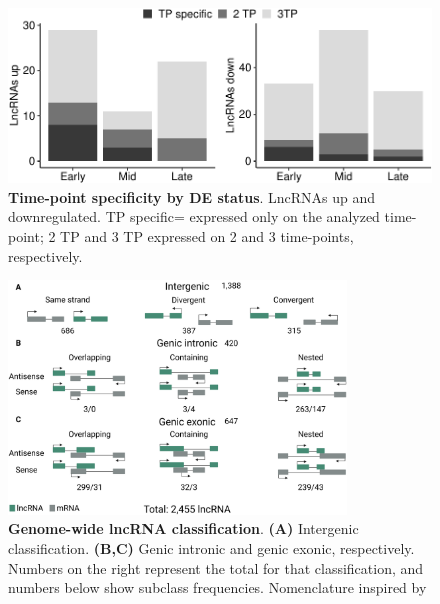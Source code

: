 \begin{figure}[ht!]
  \centering
  \includegraphics[scale=0.75]{plots/appendix/dme/time.point.specificity.pdf}
  \caption[Time-point specificity by DE status]{\textbf{Time-point specificity by DE status}. LncRNAs up and downregulated. TP specific= expressed only on the analyzed time-point; 2 TP and 3 TP expressed on 2 and 3 time-points, respectively.}
  \label{fig:time-point-specific-up-down}
\end{figure}

\begin{figure}[!htb]
  \centering
  \includegraphics[width=0.8\textwidth]{img/appendix/dme/lncRNA_gw_classification.png}
  \caption[Genome-wide lncRNA classification]{\textbf{Genome-wide lncRNA classification}. \textbf{(A)} Intergenic classification. \textbf{(B,C)} Genic intronic and genic exonic, respectively. Numbers on the right represent the total for that classification, and numbers below show subclass frequencies. Nomenclature inspired by \autocite{wucher_2017}}
  \label{fig:gw_lncRNA_class}
\end{figure}

